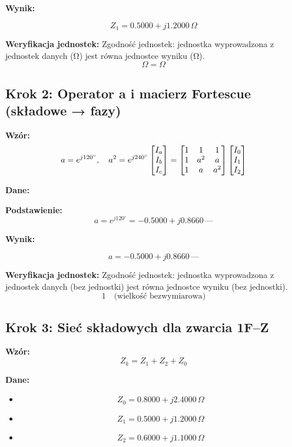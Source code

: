 \documentclass[11pt,a4paper]{article}
\begin{document}
\textbf{Wynik:}
\begin{center}
$$
Z_1 = 0.5000 + j1.2000\,\Omega
$$
\end{center}

\textbf{Weryfikacja jednostek:} Zgodność jednostek: jednostka wyprowadzona z jednostek danych (Ω) jest równa jednostce wyniku (Ω).
$$
\Omega = \Omega
$$

\subsection{Krok 2: Operator a i macierz Fortescue (składowe → fazy)}

\textbf{Wzór:}
$$
a = e^{j 120^\circ}, \quad a^2 = e^{j 240^\circ} \\\begin{bmatrix} I_a \\ I_b \\ I_c \end{bmatrix} =\begin{bmatrix} 1 & 1 & 1 \\ 1 & a^2 & a \\ 1 & a & a^2 \end{bmatrix}\begin{bmatrix} I_0 \\ I_1 \\ I_2 \end{bmatrix}
$$

\textbf{Dane:}
\begin{itemize}
\end{itemize}

\textbf{Podstawienie:}
$$
a = e^{j 120^\circ} = -0.5000 + j0.8660\,\text{—}
$$

\textbf{Wynik:}
\begin{center}
$$
a = -0.5000 + j0.8660\,\text{—}
$$
\end{center}

\textbf{Weryfikacja jednostek:} Zgodność jednostek: jednostka wyprowadzona z jednostek danych (bez jednostki) jest równa jednostce wyniku (bez jednostki).
$$
1 \quad \text{(wielkość bezwymiarowa)}
$$

\subsection{Krok 3: Sieć składowych dla zwarcia 1F–Z}

\textbf{Wzór:}
$$
Z_k = Z_1 + Z_2 + Z_0
$$

\textbf{Dane:}
\begin{itemize}
  \item
$$
Z_0 = 0.8000 + j2.4000\,\Omega
$$
  \item
$$
Z_1 = 0.5000 + j1.2000\,\Omega
$$
  \item
$$
Z_2 = 0.6000 + j1.1000\,\Omega
$$
\end{itemize}
\end{document}
